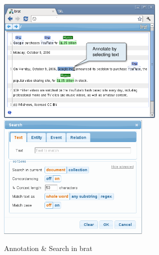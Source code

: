 \begin{figure}[ht]\centering
 \includegraphics[height=6cm]{../PIC/brat}\quad
 \includegraphics[height=6cm]{../PIC/brat-search}
 \caption{Annotation \& Search in brat}\label{fig:brat}
\end{figure}


